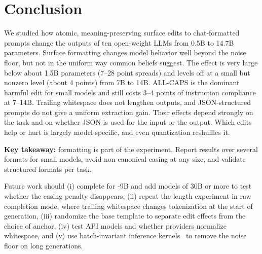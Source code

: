 \section{Conclusion}
\label{sec:conclusion}

We studied how atomic, meaning-preserving surface edits to chat-formatted prompts change the outputs of ten open-weight LLMs from 0.5B to 14.7B parameters. Surface formatting changes model behavior well beyond the noise floor, but not in the uniform way common beliefs suggest. The effect is very large below about 1.5B parameters (7--28 point spreads) and levels off at a small but nonzero level (about 4 points) from 7B to 14B. ALL-CAPS is the dominant harmful edit for small models and still costs 3--4 points of instruction compliance at 7--14B. Trailing whitespace does not lengthen outputs, and JSON-structured prompts do not give a uniform extraction gain. Their effects depend strongly on the task and on whether JSON is used for the input or the output. Which edits help or hurt is largely model-specific, and even quantization reshuffles it.

{\bf Key takeaway:} formatting is part of the experiment. Report results over several formats for small models, avoid non-canonical casing at any size, and validate structured formats per task.

Future work should (i) complete \ifeval for \gemma-9B and add models of 30B or more to test whether the casing penalty disappears, (ii) repeat the length experiment in raw completion mode, where trailing whitespace changes tokenization at the start of generation, (iii) randomize the base template to separate edit effects from the choice of anchor, (iv) test API models and whether providers normalize whitespace, and (v) use batch-invariant inference kernels~\cite{he2025defeating} to remove the noise floor on long generations.
